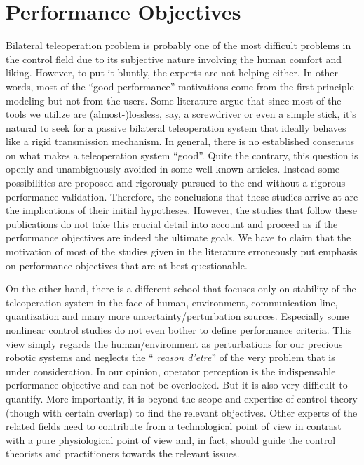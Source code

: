 \chapter{Performance Objectives}
\label{chap:perf}


Bilateral teleoperation problem is probably one of the most difficult problems in the control field due to its 
subjective nature involving the human comfort and liking. However, to put it bluntly, the experts are not helping 
either. In other words, most of the \enquote{good performance} motivations come from the first principle modeling
but not from the users. 
Some literature argue that since most of the tools we utilize are (almost-)lossless, say, a 
screwdriver or even a simple stick, it's natural to seek for a passive bilateral teleoperation system that 
ideally behaves like a rigid transmission mechanism. In general, there is no established consensus on what makes 
a teleoperation system \enquote{good}. Quite the contrary, this question is openly and unambiguously avoided in some 
well-known articles. Instead some possibilities are proposed and rigorously pursued to the end without a rigorous
performance validation. Therefore, the conclusions 
that these studies arrive at are the implications of their initial hypotheses. However, the studies that follow these 
publications do not take this crucial detail into account and proceed as if the performance objectives are 
indeed the ultimate goals. We have to claim that the motivation of most of the studies given in the literature 
erroneously put emphasis on performance objectives that are at best questionable. 

On the other hand, there is a different school that focuses only on stability of the teleoperation system in the 
face of human, environment, communication line, quantization and many more uncertainty/perturbation sources. 
Especially some nonlinear control studies do not even bother to define performance criteria. This view simply 
regards the human/environment as perturbations for our precious robotic systems and neglects the \enquote{\emph{%
reason d'etre}} of the very problem that is under consideration. In our opinion, operator perception is the 
indispensable performance objective and can not be overlooked. But it is also very difficult to quantify. More 
importantly, it is beyond the scope and expertise of control theory (though with certain overlap) to find the relevant 
objectives. Other experts of the related fields need to contribute from a technological point of view in 
contrast with a pure physiological point of view and, in fact,  should guide the control theorists and practitioners 
towards the relevant issues. 

